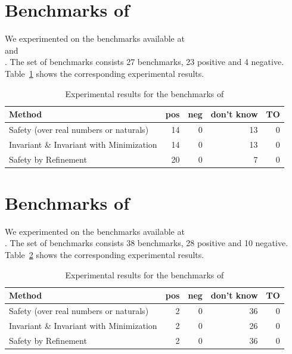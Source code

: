 \documentclass{llncs}
\begin{document}
\section{Benchmarks of \mist}

We experimented on the benchmarks available at \\
and \\
.
The set of benchmarks consists 27 benchmarks, 23 positive and 4 negative.
Table~\ref{mist-experiments} shows the corresponding experimental results.

\begin{table}[h]
\begin{center}
  \begin{tabular}{ | p{6cm} | r | r | r | r | }
    \hline
    Method & pos & neg & don't know & TO \\
    \hline
    Safety (over real numbers or naturals)      & 14 &  0 & 13 &  0 \\
    Invariant \& Invariant with Minimization    & 14 &  0 & 13 &  0 \\
    Safety by Refinement                        & 20 &  0 &  7 &  0 \\
    \hline
  \end{tabular}
\end{center}
\caption{Experimental results for the benchmarks of \mist}
\label{mist-experiments}
\end{table}

\section{Benchmarks of \iic}

We experimented on the benchmarks available at \\
.
The set of benchmarks consists 38 benchmarks, 28 positive and 10 negative.
Table~\ref{iic-experiments} shows the corresponding experimental results.

\begin{table}[h]
\begin{center}
  \begin{tabular}{ | p{6cm} | r | r | r | r | }
    \hline
    Method & pos & neg & don't know & TO \\
    \hline
    Safety (over real numbers or naturals)      & 2 & 0 & 36 & 0 \\
    Invariant \& Invariant with Minimization    & 2 & 0 & 26 & 0 \\
    Safety by Refinement                        & 2 & 0 & 36 & 0 \\
    \hline
  \end{tabular}
\end{center}
\caption{Experimental results for the benchmarks of \iic}
\label{iic-experiments}
\end{table}
\end{document}
